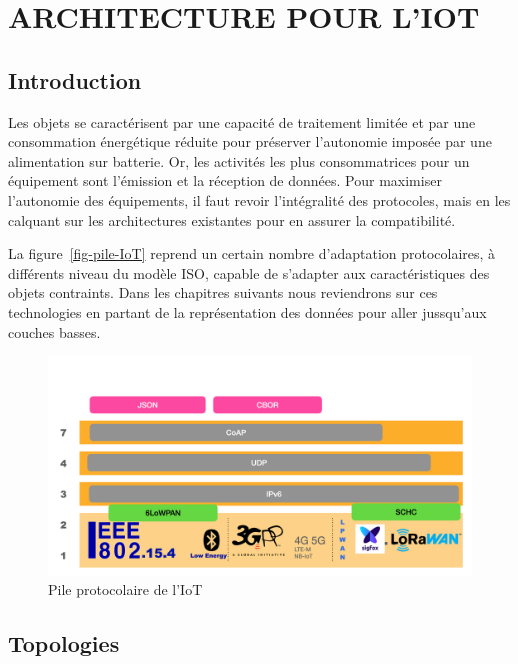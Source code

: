 \chapter{ARCHITECTURE POUR L'IOT}

\section{Introduction}
  
    \vspace{1em}
   

Les objets se caractérisent 
par 
une capacité
de traitement limitée et par une consommation énergétique réduite pour préserver l’autonomie imposée par une alimentation sur batterie.
Or, les activités les plus consommatrices pour un équipement sont l’émission et la réception de données. 
Pour maximiser l’autonomie des équipements, il faut revoir l’intégralité des protocoles, mais en les calquant sur les architectures existantes pour en assurer la compatibilité. 

La figure~\vref{fig-pile-IoT} reprend un certain nombre d'adaptation protocolaires, à différents niveau du modèle ISO, capable de s'adapter aux caractéristiques des objets contraints. Dans les chapitres suivants nous reviendrons sur ces technologies en partant de la représentation des données pour aller jussqu'aux couches basses.

\begin{figure}[tbp]
\centerline{\includegraphics[width=1\columnwidth]{Pictures/Capture17.png}}
\caption{Pile protocolaire de l'IoT}
\label{fig-pile-IoT}
\end{figure}

\section{Topologies}

